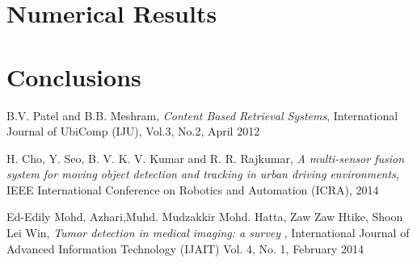 \documentclass{usiinftr}
\begin{document}
\section{Numerical Results}


\section{Conclusions}

  


\begin{thebibliography}{1}
	
	
	B.V. Patel and B.B. Meshram,
	\textit{Content Based Retrieval Systems},
	International Journal of UbiComp (IJU), Vol.3, No.2, 
	April 2012
	
	H. Cho, Y. Seo, B. V. K. V. Kumar and R. R. Rajkumar, 
	\textit{A multi-sensor fusion system for moving object detection and tracking in urban driving environments}, 
	IEEE International Conference on Robotics and Automation (ICRA), 
	2014
	
	Ed-Edily Mohd,  Azhari,Muhd. Mudzakkir Mohd. Hatta, Zaw Zaw Htike,  Shoon Lei Win, 
	\textit{Tumor detection in medical imaging: a survey }, 
	International Journal of Advanced Information Technology (IJAIT) Vol. 4, No. 1, 
	February 2014
	
	
\end{thebibliography}


\end{document}
